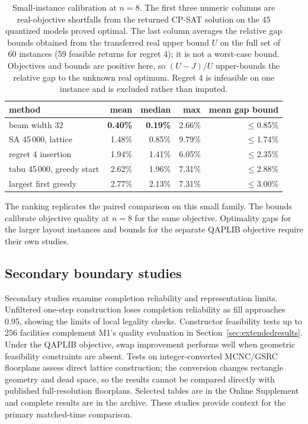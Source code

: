 \documentclass[preprint,12pt,authoryear,nonatbib]{elsarticle}
\begin{document}
\begin{table}[t]
\centering
\caption{Small-instance calibration at $n=8$. The first three numeric columns
are real-objective shortfalls from the returned CP-SAT solution on the 45
quantized models proved optimal. The last column averages the relative gap
bounds obtained from the transferred real upper bound $U$ on the full set of
60 instances (59 feasible returns for regret 4); it is not a worst-case bound. Objectives and bounds are positive here, so
$(U-J)/U$ upper-bounds the relative gap to the unknown real optimum. Regret 4 is
infeasible on one instance and is excluded rather than imputed.}
\label{tab:gaps}
\small
\setlength{\tabcolsep}{4pt}
\begin{tabular}{@{}lrrrr@{}}
\toprule
method & mean & median & max & mean gap bound \\
\midrule
beam width 32          & \textbf{0.40\%} & \textbf{0.19\%} & 2.66\% & $\le$0.85\% \\
SA 45\,000, lattice    & 1.48\% & 0.85\% & 9.79\% & $\le$1.74\% \\
regret 4 insertion     & 1.94\% & 1.41\% & 6.05\% & $\le$2.35\% \\
tabu 45\,000, greedy start & 2.62\% & 1.96\% & 7.31\% & $\le$2.88\% \\
largest first greedy   & 2.77\% & 2.13\% & 7.31\% & $\le$3.00\% \\
\bottomrule
\end{tabular}
\end{table}

The ranking replicates the paired comparison on this small family. The bounds
calibrate objective quality at $n=8$ for the same objective. Optimality gaps for the larger layout instances and bounds for the separate
QAPLIB objective require their own studies.


\subsection{Secondary boundary studies}
\label{sec:results_density}
\label{sec:results_scale}
\label{sec:results_qap}
\label{sec:results_mcnc}
Secondary studies examine completion reliability and representation limits.
Unfiltered one-step construction loses completion reliability as fill approaches
0.95, showing the limits of local legality checks. Constructor feasibility tests
up to 256 facilities complement M1's quality evaluation in
Section~\ref{sec:extendedresults}. Under the QAPLIB objective, swap improvement
performs well when geometric feasibility constraints are absent. Tests on
integer-converted MCNC/GSRC floorplans assess direct lattice construction;
the conversion changes rectangle geometry and dead space, so the results
cannot be compared directly with published full-resolution floorplans.
Selected tables are in the Online Supplement and complete results are in the
archive. These studies provide context for the primary matched-time comparison.
\end{document}
